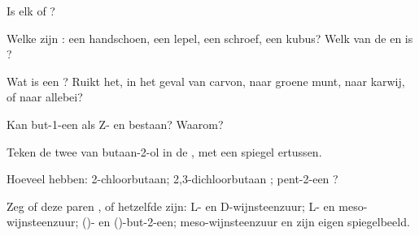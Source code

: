 \begin{exercise}[$\star$]\label{exo:g12:stereochemistry:2}
Is elk   of ?
\begin{center}
 \qquad
{}
\end{center}
\end{exercise}

\begin{exercise}[$\star$]\label{exo:g12:stereochemistry:3}
Welke zijn : een handschoen, een lepel, een schroef, een kubus?
Welk van de   en  is ?
\end{exercise}

\begin{exercise}[$\star$]\label{exo:g12:stereochemistry:4}
Wat is een ? Ruikt het, in het geval van carvon, naar
groene munt, naar karwij, of naar allebei?
\end{exercise}

\begin{exercise}[$\star$]\label{exo:g12:stereochemistry:5}
Kan but-1-een  als Z- en  bestaan? Waarom?
\end{exercise}

\begin{exercise}[$\star\star$]\label{exo:g12:stereochemistry:6}
Teken de twee  van butaan-2-ol in de ,
met een spiegel ertussen.
\end{exercise}

\begin{exercise}[$\star\star$]\label{exo:g12:stereochemistry:7}
Hoeveel  hebben: 2-chloorbutaan;
2,3-dichloorbutaan ; pent-2-een
?
\end{exercise}

\begin{exercise}[$\star\star$]\label{exo:g12:stereochemistry:8}
Zeg of deze paren ,  of hetzelfde 
zijn: L- en D-wijnsteenzuur; L- en meso-wijnsteenzuur; ()- en
()-but-2-een; meso-wijnsteenzuur en zijn eigen spiegelbeeld.
\end{exercise}

